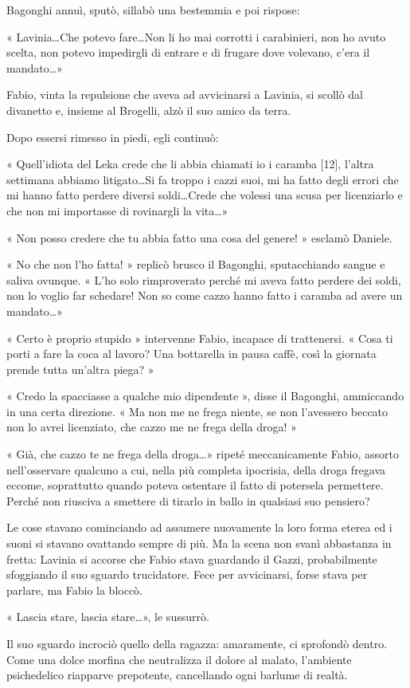 Bagonghi annuì, sputò, sillabò una bestemmia e poi rispose:

« Lavinia\ldots Che potevo fare\ldots Non li ho mai corrotti i carabinieri, non ho avuto scelta, non potevo impedirgli di entrare e di frugare dove volevano, c'era il mandato\ldots »

Fabio, vinta la repulsione che aveva ad avvicinarsi a Lavinia, si scollò dal divanetto e, insieme al Brogelli, alzò il suo amico da terra.

Dopo essersi rimesso in piedi, egli continuò:

« Quell'idiota del Leka crede che li abbia chiamati io i caramba [12], l'altra settimana abbiamo litigato\ldots Si fa troppo i cazzi suoi, mi ha fatto degli errori che mi hanno fatto perdere diversi soldi\ldots Crede che volessi una scusa per licenziarlo e che non mi importasse di rovinargli la vita\ldots »

« Non posso credere che tu abbia fatto una cosa del genere! » esclamò Daniele.

« No che non l'ho fatta! » replicò brusco il Bagonghi, sputacchiando sangue e saliva ovunque. « L'ho solo rimproverato perché mi aveva fatto perdere dei soldi, non lo voglio far schedare! Non so come cazzo hanno fatto i caramba ad avere un mandato\ldots »

« Certo è proprio stupido » intervenne Fabio, incapace di trattenersi. « Cosa ti porti a fare la coca al lavoro? Una bottarella in pausa caffè, così la giornata prende tutta un'altra piega? »

« Credo la spacciasse a qualche mio dipendente », disse il Bagonghi, ammiccando in una certa direzione. « Ma non me ne frega niente, se non l'avessero beccato non lo avrei licenziato, che cazzo me ne frega della droga! »

« Già, che cazzo te ne frega della droga\ldots » ripeté meccanicamente Fabio, assorto nell'osservare qualcuno a cui, nella più completa ipocrisia, della droga fregava eccome, soprattutto quando poteva ostentare il fatto di potersela permettere. Perché non riusciva a smettere di tirarlo in ballo in qualsiasi suo pensiero?

Le cose stavano cominciando ad assumere nuovamente la loro forma eterea ed i suoni si stavano ovattando sempre di più. Ma la scena non svanì abbastanza in fretta: Lavinia si accorse che Fabio stava guardando il Gazzi, probabilmente sfoggiando il suo sguardo trucidatore. Fece per avvicinarsi, forse stava per parlare, ma Fabio la bloccò.

« Lascia stare, lascia stare\ldots », le sussurrò.

Il suo sguardo incrociò quello della ragazza: amaramente, ci sprofondò dentro. Come una dolce morfina che neutralizza il dolore al malato, l'ambiente psichedelico riapparve prepotente, cancellando ogni barlume di realtà.
